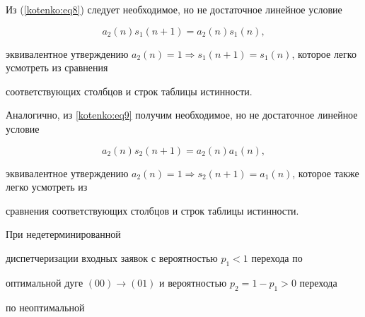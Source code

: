 Из (\ref{kotenko:eq8}) следует необходимое, но не достаточное линейное условие

\[

a_2 ( n )s_1 (n+1)=a_2 ( n )s_1 (n),

\]

эквивалентное утверждению $a_2 ( n )=1 \Rightarrow s_1 (n+1)=s_1 ( n )$, которое легко усмотреть из сравнения

соответствующих столбцов и строк таблицы истинности.



Аналогично, из \eqref{kotenko:eq9} получим необходимое, но не достаточное линейное условие

\[

a_2 ( n )s_2 (n+1)=a_2 ( n )a_1 (n),

\]

эквивалентное утверждению $a_2 ( n )=1\Rightarrow s_2 (n+1)=a_1 ( n )$, которое также легко усмотреть из

сравнения соответствующих столбцов и строк таблицы истинности.



\smallskip



 При недетерминированной

диспетчеризации входных заявок с вероятностью $p_1<1$ перехода по

оптимальной дуге $(00) \to (01)$ и вероятностью $p_2=1-p_1>0$ перехода

по неоптимальной 







